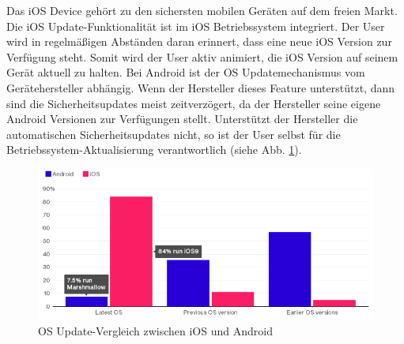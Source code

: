 Das iOS Device gehört zu den sichersten mobilen Geräten auf dem freien Markt. Die iOS Update-Funktionalität ist im iOS Betriebssystem integriert. Der User wird in regelmäßigen Abständen daran erinnert, dass eine neue iOS Version zur Verfügung steht. Somit wird der User aktiv animiert, die iOS Version auf seinem Gerät aktuell zu halten. Bei Android ist der OS Updatemechanismus vom Gerätehersteller abhängig. Wenn der Hersteller dieses Feature unterstützt, dann sind die Sicherheitsupdates meist zeitverzögert, da der Hersteller seine eigene Android Versionen zur Verfügungen stellt. Unterstützt der Hersteller die automatischen Sicherheitsupdates nicht, so ist der User selbst für die Betriebssystem-Aktualisierung verantwortlich (siehe Abb. \ref{fig:VergleichUpdateiOSAndroid}).\par
 \begin{figure}[hp!]
        \centering
                \includegraphics[scale=0.8]{Bilder/updatesiOSAndroid.PNG}
        \caption{OS Update-Vergleich zwischen iOS und Android \cite{ANDROID[1]} \protect\footnotemark}
        \label{fig:VergleichUpdateiOSAndroid}
\end{figure}


